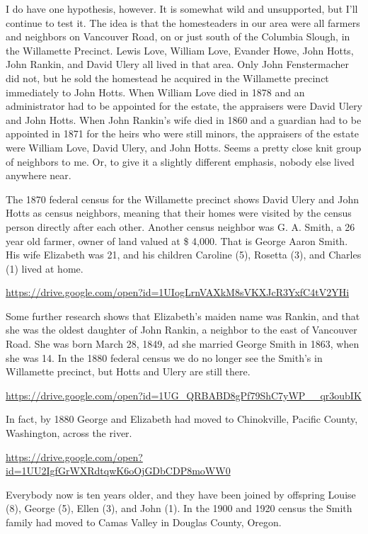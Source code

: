 \documentclass[
  12pt,
]{book}
\begin{document}
I do have one hypothesis, however. It is somewhat wild and unsupported, but I'll continue to test it. The idea is that the homesteaders in our area were all farmers and neighbors on Vancouver Road, on or just south of the Columbia Slough, in the Willamette Precinct. Lewis Love, William Love, Evander Howe, John Hotts, John Rankin, and David Ulery all lived in that area. Only John Fenstermacher did not, but he sold the homestead he acquired in the Willamette precinct immediately to John Hotts. When William Love died in 1878 and an administrator had to be appointed for the estate, the appraisers were David Ulery and John Hotts. When John Rankin's wife died in 1860 and a guardian had to be appointed in 1871 for the heirs who were still minors, the appraisers of the estate were William Love, David Ulery, and John Hotts. Seems a pretty close knit group of neighbors to me. Or, to give it a slightly different emphasis, nobody else lived anywhere near.

The 1870 federal census for the Willamette precinct shows David Ulery and John Hotts as census neighbors, meaning that their homes were visited by the census person directly after each other. Another census neighbor was G. A. Smith, a 26 year old farmer, owner of land valued at \$ 4,000. That is George Aaron Smith. His wife Elizabeth was 21, and his children Caroline (5), Rosetta (3), and Charles (1) lived at home.

\url{https://drive.google.com/open?id=1UIogLrnVAXkM8sVKXJcR3YxfC4tV2YHi}

Some further research shows that Elizabeth's maiden name was Rankin, and that she was the oldest daughter of John Rankin, a neighbor to the east of Vancouver Road. She was born March 28, 1849, ad she married George Smith in 1863, when she was 14. In the 1880 federal census we do no longer see the Smith's in Willamette precinct, but Hotts and Ulery are still there.

\url{https://drive.google.com/open?id=1UG_QRBABD8gPf79ShC7yWP__qr3oubIK}

In fact, by 1880 George and Elizabeth had moved to Chinokville, Pacific County, Washington, across the river.

\url{https://drive.google.com/open?id=1UU2IgfGrWXRdtqwK6oOjGDbCDP8moWW0}

Everybody now is ten years older, and they have been joined by offspring Louise (8), George (5), Ellen (3), and John (1). In the 1900 and 1920 census the Smith family had moved to Camas Valley in Douglas County, Oregon.
\end{document}
